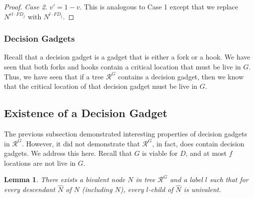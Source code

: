 \documentclass[11pt]{article}
\numberwithin{theorem}{section}
\newtheorem{lemma}[theorem]{Lemma}
\begin{document}
\begin{proof}
\emph{Case 2.} $v' = 1-v$. This is analogous to Case 1 except that we replace  $N^{rl\cdot FD_j}$ with $N^{l\cdot FD_j}$.
\end{proof}

\subsubsection{Decision Gadgets}
Recall that a decision gadget is a gadget that is either a fork or a hook. We have seen that both forks and hooks contain a critical location that must be live in $G$. 
Thus, we have seen that if a tree $\mathcal{R}^G$ contains a decision gadget, then we know that the critical location of that decision gadget must be live in $G$. 



\subsection{Existence of a Decision Gadget} 
\label{subsubsec:existanceOfHook}
The previous subsection demonstrated interesting properties of decision gadgets in $\mathcal{R}^G$. However, it did not demonstrate that $\mathcal{R}^G$, in fact, does contain decision gadgets. We address this here.
Recall that $G$ is viable for $D$, and at most $f$ locations are not live in $G$.  
 



\begin{lemma}\label{lem:bivalentToMonovalent}
There exists a bivalent node $N$ in tree $\mathcal{R}^{G}$ and a label $l$ such that for every descendant $\hat{N}$ of $N$ (including $N$), every $l$-child of $\hat{N}$ is univalent.
\end{lemma}
\end{document}
